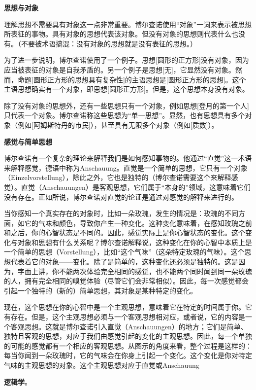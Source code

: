 \textbf{思想与对象}  

理解思想不需要具有对象这一点非常重要。博尔查诺使用“对象”一词来表示被思想所表征的事物。具有对象的思想代表该对象。但没有对象的思想则代表什么也没有。（不要被术语搞混：没有对象的思想就是没有表征的思想。）

为了进一步说明，博尔查诺使用了一个例子。思想[圆形的正方形]没有对象，因为应当被表征的对象是自我矛盾的。另一个例子是思想[无]，它显然没有对象。然而，命题[圆形正方形的思想具有复杂性]的主语思想是[圆形正方形的思想]。这个主语思想确实有一个对象，即思想[圆形正方形]。但是，这个思想本身没有对象。

除了没有对象的思想外，还有一些思想只有一个对象，例如思想[登月的第一个人]只代表一个对象。博尔查诺称这些思想为“单一思想”。显然，也有思想具有多个对象（例如[阿姆斯特丹的市民]），甚至具有无限多个对象（例如[质数]）。

\textbf{感觉与简单思想}

博尔查诺有一个复杂的理论来解释我们是如何感知事物的。他通过“直觉”这一术语来解释感觉，德语中称为Anschauung。直觉是一个简单的思想，它只有一个对象（Einzelvorstellung），除此之外，它也是独特的（博尔查诺需要这个来解释感觉）。直觉（Anschauungen）是客观思想，它们属于“本身的”领域，这意味着它们没有存在。正如所说，博尔查诺对直觉的论证是通过对感觉的解释来进行的。

当你感知一个真实存在的对象时，比如一朵玫瑰，发生的情况是：玫瑰的不同方面，如它的气味和颜色，导致你产生一种变化。这种变化意味着，在感知玫瑰之前和之后，你的心智状态是不同的。因此，感觉实际上是你心智状态的变化。这个变化与对象和思想有什么关系呢？博尔查诺解释说，这种变化在你的心智中本质上是一个简单的思想（Vorstellung），比如“这个气味”（这朵特定玫瑰的气味）。这个思想代表着它的对象——变化。除了是简单的，这种变化还必须是独特的。这是因为，字面上讲，你不能两次体验完全相同的感觉，也不能两个同时闻到同一朵玫瑰的人，拥有完全相同的嗅觉体验（尽管它们会非常相似）。因此，每一次感觉都会引起一个独特的（新的）简单思想，其对象是某种特定的变化。

现在，这个思想在你的心智中是一个主观思想，意味着它在特定的时间属于你。它有存在。但是，这个主观思想必须与一个客观思想相对应，或者说，它的内容是一个客观思想。这就是博尔查诺引入直觉（Anschauungen）的地方；它们是简单、独特且客观的思想，对应于我们由感觉引起的变化的主观思想。因此，每一个单独的可能的感觉都有一个相应的客观思想。从图示的角度来看，整个过程是这样的：每当你闻到一朵玫瑰时，它的气味会在你身上引起一个变化。这个变化是你对特定气味的主观思想的对象。这个主观思想对应于直觉或Anschauung

\textbf{逻辑学}。

